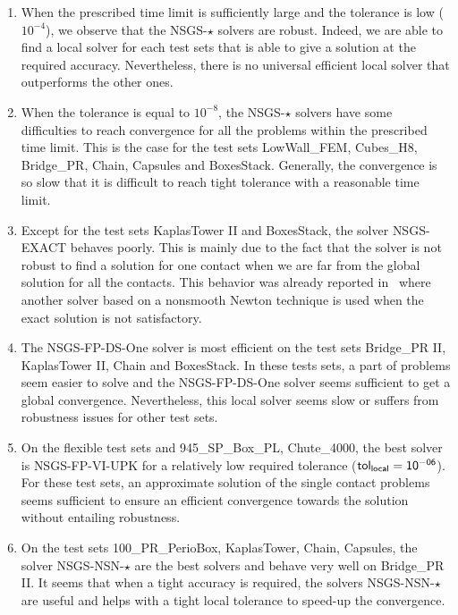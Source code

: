 \begin{enumerate}
\item When the prescribed time limit is sufficiently large and the tolerance is low ($10^{-4}$), we observe that the {\sf NSGS-$\star$} solvers are robust. Indeed, we are able to find a local solver for each test sets that is able to give a solution at the required accuracy. Nevertheless, there is no universal efficient local solver that outperforms the other ones.
  
\item When the tolerance is equal to $10^{-8}$,  the {\sf NSGS-$\star$} solvers have some difficulties to reach convergence for all the problems within the prescribed time limit. This is the case for the test sets LowWall\_FEM, Cubes\_H8, Bridge\_PR, Chain,  Capsules and BoxesStack. Generally, the convergence is so slow that it is difficult to reach tight tolerance with a reasonable time limit.
 
\item Except for the test sets KaplasTower II and BoxesStack, the solver {\sf NSGS-EXACT} behaves poorly. This is mainly due to the fact that the solver is not robust to find a solution for one contact when we are far from the global solution for all the contacts. This behavior was already reported in~\citep{Daviet.ea_SIGGRAPH2011} where another solver based on a nonsmooth Newton technique is used when  the exact solution is not satisfactory.
  
\item  The {\sf NSGS-FP-DS-One} solver  is most efficient on the test sets Bridge\_PR II, KaplasTower II, Chain and BoxesStack. In these tests sets, a part of problems seem easier to solve and the {\sf NSGS-FP-DS-One} solver seems sufficient to get a global convergence.
  Nevertheless, this local solver seems slow or suffers from robustness issues for other test sets.
  
\item On the flexible test sets and 945\_SP\_Box\_PL, Chute\_4000, the best solver is {\sf NSGS-FP-VI-UPK} for a relatively low required tolerance ($\sf tol_{local} =10^{-06}$). For these test sets, an approximate solution of the single contact problems seems sufficient to ensure an efficient convergence towards the solution without entailing robustness.
  
\item On the test sets 100\_PR\_PerioBox, KaplasTower,  Chain, Capsules, the solver {\sf NSGS-NSN-$\star$} are the best solvers and behave very well on Bridge\_PR II. It seems that when a tight accuracy is required, the solvers {\sf NSGS-NSN-$\star$} are useful and helps with a tight local tolerance to speed-up the convergence.
  

\end{enumerate}
